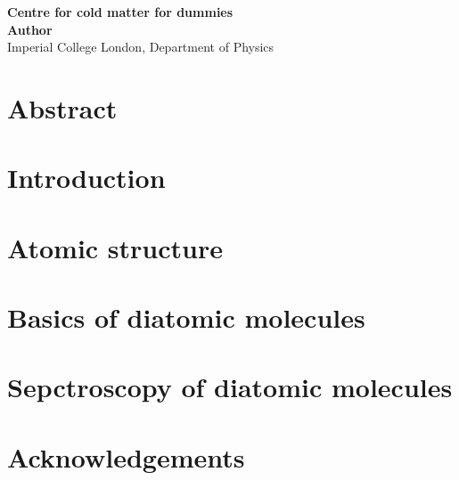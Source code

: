 \documentclass[
 aps,
 a4paper,
 showpacs,
 superscriptaddress,
 notitlepage,
 nofootinbib,
 preprint %
]{revtex4-1}
\begin{document}

\begin{titlepage}
  \begin{center}
    \vspace*{1cm}
      \textbf{Centre for cold matter for dummies} \\
    \vspace{1.5cm}
      \textbf{Author} \\
    \vspace{0.5cm}
       {Imperial College London, Department of Physics} \\
  \end{center}
\end{titlepage}

\section*{Abstract}

\clearpage

\tableofcontents
\clearpage

\setcounter{page}{4} 


\section{Introduction}


\section{Atomic structure}
\label{chiptraps}


\section{Basics of diatomic molecules}
\label{experiment}


\section{Sepctroscopy of diatomic molecules}
\label{outlook}


\clearpage

\section*{Acknowledgements}


%
%
\end{document}
